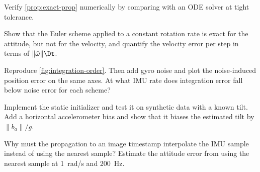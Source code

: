 \begin{exercises}
  \item Verify \cref{prop:exact-prop} numerically by comparing with an ODE solver at tight tolerance.
  \item Show that the Euler scheme applied to a constant rotation rate is exact for the attitude, but not for
        the velocity, and quantify the velocity error per step in terms of $\|\hat\omega\|\Dt$.
  \item Reproduce \cref{fig:integration-order}. Then add gyro noise and plot the noise-induced position error
        on the same axes. At what IMU rate does integration error fall below noise error for each scheme?
  \item Implement the static initializer and test it on synthetic data with a known tilt. Add a horizontal
        accelerometer bias and show that it biases the estimated tilt by $\|b_a\|/g$.
  \item Why must the propagation to an image timestamp interpolate the IMU sample instead of using the
        nearest sample? Estimate the attitude error from using the nearest sample at 1~rad/s and 200~Hz.
\end{exercises}
